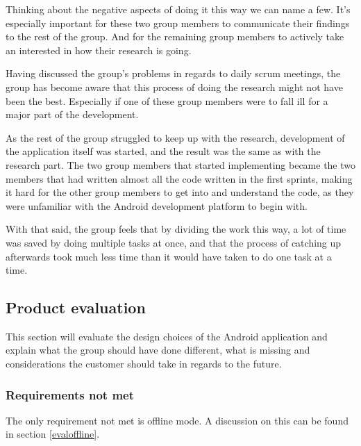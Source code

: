 Thinking about the negative aspects of doing it this way we can name a few. It’s especially important for these two group members to communicate their findings to the rest of the group. And for the remaining group members to actively take an interested in how their research is going.

Having discussed the group’s problems in regards to daily scrum meetings, the group has become aware that this process of doing the research might not have been the best. Especially if one of these group members were to fall ill for a major part of the development.

As the rest of the group struggled to keep up with the research, development of the application itself was started, and the result was the same as with the research part. The two group members that started implementing became the two members that had written almost all the code written in the first sprints, making it hard for the other group members to get into and understand the code, as they were unfamiliar with the Android development platform to begin with.

With that said, the group feels that by dividing the work this way, a lot of time was saved by doing multiple tasks at once, and that the process of catching up afterwards took much less time than it would have taken to do one task at a time.

\newpage

\subsection{Product evaluation}
\label{productEval}

This section will evaluate the design choices of the Android application and explain what the group should have done different, what is missing and considerations the customer should take in regards to the future.

\subsubsection{Requirements not met}
The only requirement not met is offline mode. A discussion on this can be found in section \ref{evaloffline}.

